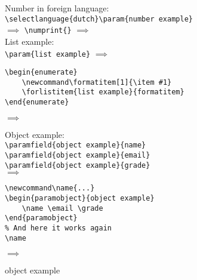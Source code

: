 \documentclass{article}
\begin{document}
    Number in foreign language:\\

    \lstinline[style=TeX,morekeywords={param,selectlanguage}]|\selectlanguage{dutch}\param{number example}|\\
    $\implies$
    \lstinline[style=TeX,morekeywords={numprint}]|\numprint{|\lstinline|}|
    $\implies$
    \begingroup{}\endgroup\\

    List example:\\

    \lstinline[style=TeX,morekeywords={param}]|\param{list example}|
    $\implies$
    \\

    \begin{lstlisting}[language={[LaTeX]TeX},morekeywords={formatitem,forlistitem}]
\begin{enumerate}
    \newcommand\formatitem[1]{\item #1}
    \forlistitem{list example}{formatitem}
\end{enumerate}
    \end{lstlisting}
    $\implies$
    \begin{enumerate}
        \newcommand\formatitem[1]{\item #1}
    \end{enumerate}

    Object example:\\

    \lstinline[style=TeX,morekeywords={paramfield}]|\paramfield{object example}{name}|\\
    \lstinline[style=TeX,morekeywords={paramfield}]|\paramfield{object example}{email}|\\
    \lstinline[style=TeX,morekeywords={paramfield}]|\paramfield{object example}{grade}|\\
    $\implies$
    \\

    \begin{lstlisting}[style=TeX,morekeywords={name,email,grade}]
\newcommand\name{...}
\begin{paramobject}{object example}
    \name \email \grade
\end{paramobject}
% And here it works again
\name
    \end{lstlisting}
    $\implies$
    \parbox{\linewidth}{
    \begin{paramobject}{object example}
        \name \email \grade
    \end{paramobject}
    \name
    }\\
\end{document}
